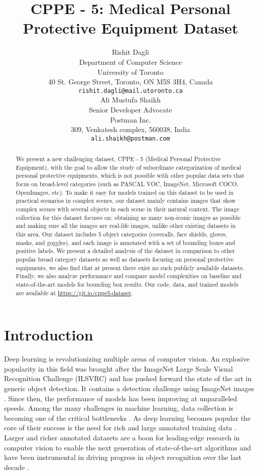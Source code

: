 \documentclass{article}
\title{CPPE - 5: Medical Personal Protective Equipment Dataset}
\author{
 Rishit Dagli \\
 Department of Computer Science\\
 University of Toronto\\
 40 St. George Street, Toronto, ON M5S 3H4, Canada\\
  \texttt{rishit.dagli@mail.utoronto.ca} \\
   \And
 Ali Mustufa Shaikh \\
 Senior Developer Advocate\\
  Postman Inc.\\
   309, Venkatesh complex, 560038, India\\
  \texttt{ali.shaikh@postman.com} \\
}
\begin{document}
\maketitle
\begin{abstract}
We present a new challenging dataset, CPPE - 5 (Medical Personal Protective Equipment), with the goal to allow the study of subordinate categorization of medical personal protective equipments, which is not possible with other popular data sets that focus on broad-level categories (such as PASCAL VOC, ImageNet, Microsoft COCO, OpenImages, etc). To make it easy for models trained on this dataset to be used in practical scenarios in complex scenes, our dataset mainly contains images that show complex scenes with several objects in each scene in their natural context. The image collection for this dataset focuses on: obtaining as many non-iconic images as possible and making sure all the images are real-life images, unlike other existing datasets in this area. Our dataset includes 5 object categories (coveralls, face shields, gloves, masks, and goggles), and each image is annotated with a set of bounding boxes and positive labels. We present a detailed analysis of the dataset in comparison to other popular broad category datasets as well as datasets focusing on personal protective equipments, we also find that at present there exist no such publicly available datasets. Finally, we also analyze performance and compare model complexities on baseline and state-of-the-art models for bounding box results. Our code, data, and trained models are available at \url{https://git.io/cppe5-dataset}.
\end{abstract}


\section{Introduction}
\label{Introduction}

Deep learning is revolutionizing multiple areas of computer vision. An explosive popularity in this field was brought after the ImageNet Large Scale Visual Recognition Challenge (ILSVRC) \cite{russakovsky2015imagenet} and has pushed forward the state of the art in
generic object detection. It contains a detection challenge using ImageNet images \cite{deng2009imagenet}. Since then, the performance of models has been improving at unparalleled speeds. Among the many challenges in machine learning, data collection is becoming one of the critical bottlenecks \cite{roh2019survey}. As deep learning becomes popular the core of their success is the need for rich and large annotated training data \cite{Goodfellow-et-al-2016}. Larger and richer annotated datasets are a boon for leading-edge research in computer vision to enable the next generation of state-of-the-art algorithms \cite{kuznetsova2020} and have been instrumental in driving progress in object recognition over the last decade \cite{krizhevsky2012imagenet, sermanet2014overfeat, viola2001robust, redmon2016you}.
\end{document}
